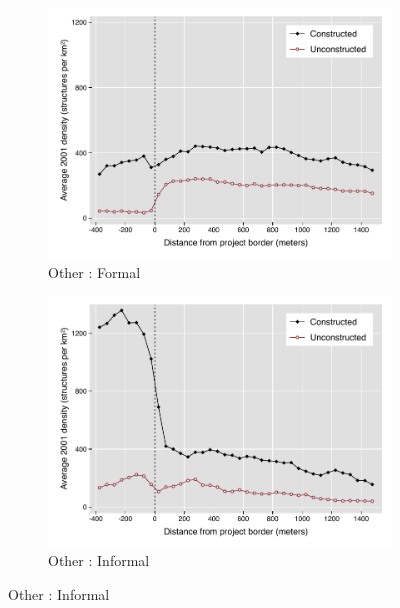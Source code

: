 \documentclass[12pt]{article}
\begin{document}
\begin{figure}
\begin{subfigure}[b]{0.495\textwidth}
        \end{subfigure}
        \begin{subfigure}[b]{0.495\textwidth}  
            \centering 
            \caption{Other : Formal}
            \includegraphics[width=\textwidth,trim={0.3cm .3cm 0.1cm 0cm}, clip=true]{figures/bblu_for_pre_means_4_3.pdf}
        \end{subfigure}
        \hfill
        \begin{subfigure}[b]{0.495\textwidth}
            \centering
            \caption{Other : Informal}
            \includegraphics[width=\textwidth,trim={0.3cm .3cm 0.1cm 0cm}, clip=true]{figures/bblu_inf_pre_means_4_3.pdf}
        \end{subfigure}
    \end{figure} 
\end{document}
